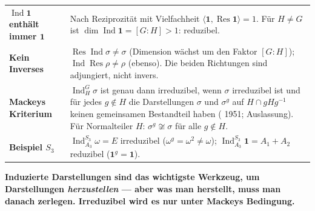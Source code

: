 \begin{warnung}
\begin{center}
{\small
\renewcommand{\arraystretch}{1.5}
\begin{tabular}{@{}P{3.2cm}P{5.4cm}@{}}
\toprule
\textbf{$\operatorname{Ind}\mathbf 1$ enthält immer $\mathbf 1$} & Nach Reziprozität mit Vielfachheit $\langle\mathbf 1, \operatorname{Res}\mathbf 1\rangle = 1$. Für $H\neq G$ ist $\dim\operatorname{Ind}\mathbf 1 = [G\colon H] > 1$: reduzibel.\\
\textbf{Kein Inverses} & $\operatorname{Res}\operatorname{Ind}\sigma\neq\sigma$ (Dimension wächst um den Faktor $[G\colon H]$); $\operatorname{Ind}\operatorname{Res}\rho\neq\rho$ (ebenso). Die beiden Richtungen sind adjungiert, nicht invers.\\
\textbf{Mackeys Kriterium} & $\operatorname{Ind}^G_H\sigma$ ist genau dann irreduzibel, wenn $\sigma$ irreduzibel ist und für jedes $g\notin H$ die Darstellungen $\sigma$ und $\sigma^{g}$ auf $H\cap gHg^{-1}$ keinen gemeinsamen Bestandteil haben ( 1951; Auslassung). Für Normalteiler $H$: $\sigma^{g}\not\cong\sigma$ für alle $g\notin H$.\\
\textbf{Beispiel $S_3$} & $\operatorname{Ind}^{S_3}_{A_3}\omega = E$ irreduzibel ($\omega^{g} = \omega^{2}\neq\omega$); $\operatorname{Ind}^{S_3}_{A_3}\mathbf 1 = A_1 + A_2$ reduzibel ($\mathbf 1^{g} = \mathbf 1$).\\
\bottomrule
\end{tabular}}
\end{center}

\begin{center}
\begin{minipage}{0.9\textwidth}
\textbf{Induzierte Darstellungen sind das wichtigste Werkzeug, um Darstellungen \emph{herzustellen} --- aber was man herstellt, muss man danach zerlegen. Irreduzibel wird es nur unter Mackeys Bedingung.}
\end{minipage}
\end{center}

\begin{center}
\begin{minipage}{0.88\textwidth}
\end{minipage}
\end{center}
\end{warnung}

